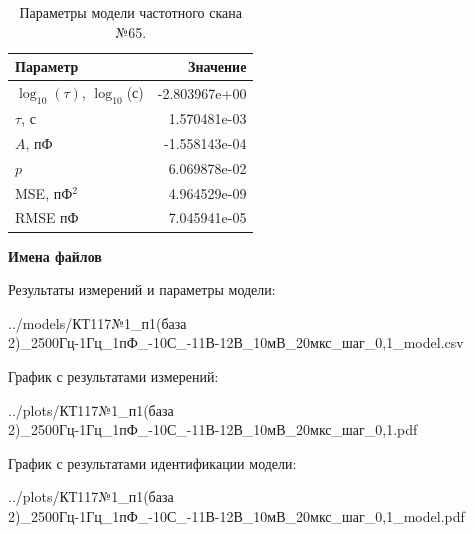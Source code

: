 \begin{table}[!ht]
    \centering
    \caption{Параметры модели частотного скана №65.}
    \begin{tabular}{|l|r|}
        \hline
        Параметр                                       & Значение                  \\ \hline
        $\log_{10}(\tau)$, $\log_{10}$(с)              & -2.803967e+00             \\ \hline
        $\tau$, с                                      & 1.570481e-03              \\ \hline
        $A$, пФ                                        & -1.558143e-04             \\ \hline
        $p$                                            & 6.069878e-02              \\ \hline
        MSE, пФ$^2$                                    & 4.964529e-09              \\ \hline
        RMSE пФ                                        & 7.045941e-05              \\ \hline
    \end{tabular}
    \label{table:frequency_scan_model_65}
\end{table}

\textbf{Имена файлов}

Результаты измерений и параметры модели:

\scriptsize../models/КТ117№1\_п1(база 2)\_2500Гц-1Гц\_1пФ\_-10С\_-11В-12В\_10мВ\_20мкс\_шаг\_0,1\_model.csv
\normalsize

График с результатами измерений:

\scriptsize../plots/КТ117№1\_п1(база 2)\_2500Гц-1Гц\_1пФ\_-10С\_-11В-12В\_10мВ\_20мкс\_шаг\_0,1.pdf
\normalsize

График с результатами идентификации модели:

\scriptsize../plots/КТ117№1\_п1(база 2)\_2500Гц-1Гц\_1пФ\_-10С\_-11В-12В\_10мВ\_20мкс\_шаг\_0,1\_model.pdf
\normalsize

